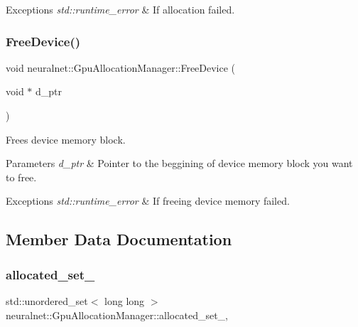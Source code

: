 \begin{DoxyExceptions}{Exceptions}
{\em std\+::runtime\+\_\+error} & If allocation failed. \\
\hline
\end{DoxyExceptions}
\mbox{\label{classneuralnet_1_1GpuAllocationManager_a24bbbc0e44887a00679b04527fee7b4a}} 
\subsubsection{\texorpdfstring{Free\+Device()}{FreeDevice()}}
{\footnotesize\ttfamily void neuralnet\+::\+Gpu\+Allocation\+Manager\+::\+Free\+Device (\begin{DoxyParamCaption}\item[{void $\ast$}]{d\+\_\+ptr }\end{DoxyParamCaption})}



Frees device memory block. 


\begin{DoxyParams}{Parameters}
{\em d\+\_\+ptr} & Pointer to the beggining of device memory block you want to free. \\
\hline
\end{DoxyParams}

\begin{DoxyExceptions}{Exceptions}
{\em std\+::runtime\+\_\+error} & If freeing device memory failed. \\
\hline
\end{DoxyExceptions}


\subsection{Member Data Documentation}
\mbox{\label{classneuralnet_1_1GpuAllocationManager_a8551c1a8fa5e6628e3db91f3724b71c9}} 
\subsubsection{\texorpdfstring{allocated\+\_\+set\+\_\+}{allocated\_set\_}}
{\footnotesize\ttfamily std\+::unordered\+\_\+set$<$ long long $>$ neuralnet\+::\+Gpu\+Allocation\+Manager\+::allocated\+\_\+set\+\_\+\hspace{0.3cm}{\ttfamily [static]}, {\ttfamily [protected]}}

